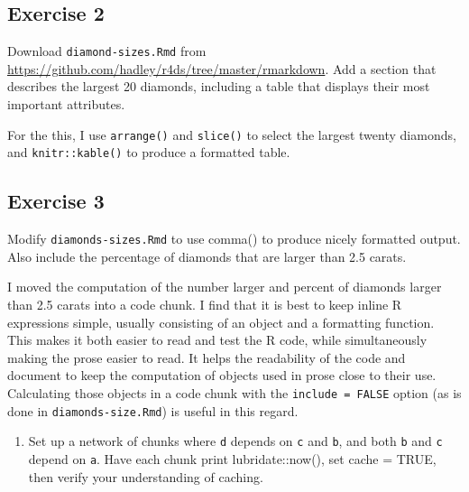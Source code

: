 \documentclass[]{book}
\providecommand{\tightlist}{%
  \setlength{\itemsep}{0pt}\setlength{\parskip}{0pt}}
\theoremstyle{definition}
\theoremstyle{definition}
\theoremstyle{definition}
\theoremstyle{remark}
\begin{document}
\hypertarget{exercise-2-66}{%
\subsection{Exercise 2}\label{exercise-2-66}}

Download \texttt{diamond-sizes.Rmd} from
\url{https://github.com/hadley/r4ds/tree/master/rmarkdown}. Add a
section that describes the largest 20 diamonds, including a table that
displays their most important attributes.

For the this, I use \texttt{arrange()} and \texttt{slice()} to select
the largest twenty diamonds, and \texttt{knitr::kable()} to produce a
formatted table.

\hypertarget{exercise-3-50}{%
\subsection{Exercise 3}\label{exercise-3-50}}

Modify \texttt{diamonds-sizes.Rmd} to use comma() to produce nicely
formatted output. Also include the percentage of diamonds that are
larger than 2.5 carats.

I moved the computation of the number larger and percent of diamonds
larger than 2.5 carats into a code chunk. I find that it is best to keep
inline R expressions simple, usually consisting of an object and a
formatting function. This makes it both easier to read and test the R
code, while simultaneously making the prose easier to read. It helps the
readability of the code and document to keep the computation of objects
used in prose close to their use. Calculating those objects in a code
chunk with the \texttt{include\ =\ FALSE} option (as is done in
\texttt{diamonds-size.Rmd}) is useful in this regard.

\begin{enumerate}
\def\labelenumi{\arabic{enumi}.}
\setcounter{enumi}{3}
\tightlist
\item
  Set up a network of chunks where \texttt{d} depends on \texttt{c} and
  \texttt{b}, and both \texttt{b} and \texttt{c} depend on \texttt{a}.
  Have each chunk print lubridate::now(), set cache = TRUE, then verify
  your understanding of caching.
\end{enumerate}
\end{document}

